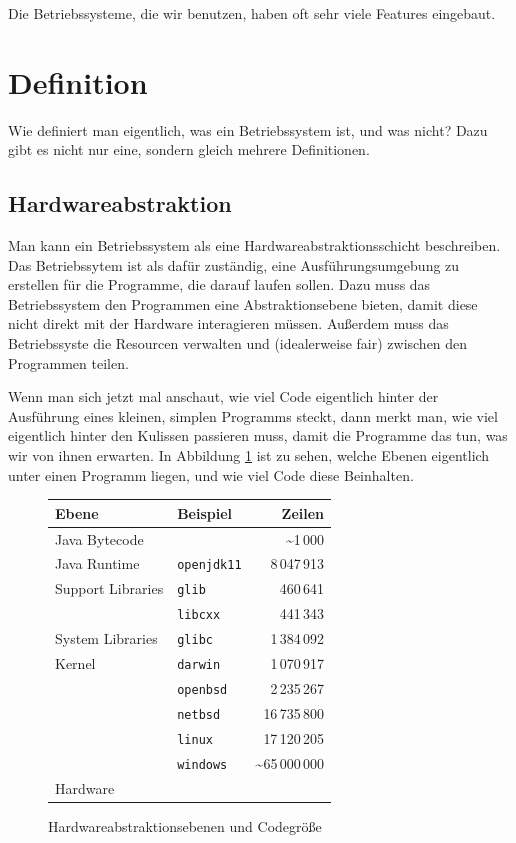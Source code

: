 \documentclass[ngerman,abstract=true]{scrartcl}
\newcommand{\tablespacing}[1]{\renewcommand{\arraystretch}{#1}}
\begin{document}
Die Betriebssysteme, die wir benutzen, haben oft sehr viele Features eingebaut. 

\section{Definition}

Wie definiert man eigentlich, was ein Betriebssystem ist, und was nicht? Dazu gibt es nicht nur eine, sondern gleich mehrere Definitionen. 

\subsection{Hardwareabstraktion}

Man kann ein Betriebssystem als eine Hardwareabstraktionsschicht beschreiben. Das Betriebssytem ist als dafür zuständig, eine Ausführungsumgebung zu erstellen für die Programme, die darauf laufen sollen. Dazu muss das Betriebssystem den Programmen eine Abstraktionsebene bieten, damit diese nicht direkt mit der Hardware interagieren müssen. Außerdem muss das Betriebssyste die Resourcen verwalten und (idealerweise fair) zwischen den Programmen teilen.

Wenn man sich jetzt mal anschaut, wie viel Code eigentlich hinter der Ausführung eines kleinen, simplen Programms steckt, dann merkt man, wie viel eigentlich hinter den Kulissen passieren muss, damit die Programme das tun, was wir von ihnen erwarten. In Abbildung \ref{fig:hardwareabstraktion} ist zu sehen, welche Ebenen eigentlich unter einen Programm liegen, und wie viel Code diese Beinhalten.
\begin{figure}[!h]\centering\tablespacing{1.4}
\begin{tabular}{@{}p{3.4cm}p{2.6cm}r@{}}
\toprule
\textbf{Ebene} & \textbf{Beispiel} & \textbf{Zeilen}\\
\midrule
Java Bytecode 
  & & \textasciitilde 1\,000\\
Java Runtime 
  & \verb|openjdk11| & 8\,047\,913\\
Support Libraries 
  & \verb|glib| & 460\,641\\
  & \verb|libcxx| & 441\,343\\
System Libraries 
  & \verb|glibc| & 1\,384\,092\\
Kernel 
  & \verb|darwin| & 1\,070\,917\\
  & \verb|openbsd| & 2\,235\,267\\
  & \verb|netbsd| & 16\,735\,800\\
  & \verb|linux| & 17\,120\,205\\
  & \verb|windows| & \textasciitilde 65\,000\,000\\
Hardware &&\\
\bottomrule 
\end{tabular}
\caption{Hardwareabstraktionsebenen und Codegröße}\label{fig:hardwareabstraktion}
\end{figure}
\end{document}
